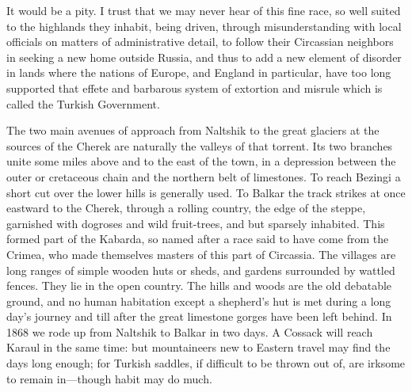 \documentclass[25pt, a4paper]{article}
\begin{document}
	It would be a pity. I trust that we may never hear of this fine race, so well suited to the highlands they inhabit, being driven, through misunderstanding with local officials on matters of administrative detail, to follow their Circassian neighbors in seeking a new home outside Russia, and thus to add a new element of disorder in lands where the nations of Europe, and England in particular, have too long supported that effete and barbarous system of extortion and misrule which is called the Turkish Government.
	
	The two main avenues of approach from Naltshik to the great glaciers at the sources of the Cherek are naturally the valleys of that torrent. Its two branches unite some miles above and to the east of the town, in a depression between the outer or cretaceous chain and the northern belt of limestones. To reach Bezingi a short cut over the lower hills is generally used. To Balkar the track strikes at once eastward to the Cherek, through a rolling country, the edge of the steppe, garnished with dogroses and wild fruit-trees, and but sparsely inhabited. This formed part of the Kabarda, so named after a race said to have come from the Crimea, who made themselves masters of this part of Circassia. The villages are long ranges of simple wooden huts or sheds, and gardens surrounded by wattled fences. They lie in the open country. The hills and woods are the old debatable ground, and no human habitation except a shepherd's hut is met during a long day's journey and till after the great limestone gorges have been left behind. In 1868 we rode up from Naltshik to Balkar in two days. A Cossack will reach Karaul in the same time: but mountaineers new to Eastern travel may find the days long enough; for Turkish saddles, if difficult to be thrown out of, are irksome to remain in—though habit may do much.
	
\end{document}
